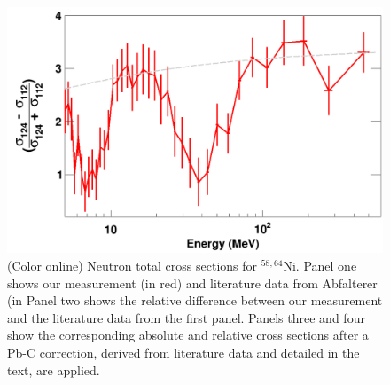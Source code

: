 \begin{figure}
    \includegraphics[scale=0.35]{figures/relativeDiff_Sn124Sn112.png}
    \caption{(Color online) Neutron total cross sections for $^{58,64}$Ni.
     Panel one shows our measurement (in red) and literature data from
     Abfalterer (in %
     Panel two shows the relative difference between our 
     measurement and the literature data from the first panel. Panels three and
     four show the corresponding absolute and relative cross sections after a
     Pb-C correction, derived from literature data and detailed in the text,
     are applied.
    }
    \label{IsotopicDifferenceSn}
\end{figure}

\afterpage{\clearpage}
